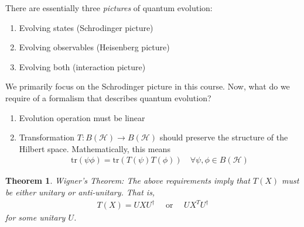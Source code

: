 \documentclass[10pt,oneside,longbibliography]{report}
\newtheorem{theorem}{Theorem}
\begin{document}
There are essentially three \textit{pictures} of quantum evolution:
\begin{enumerate}
    \item Evolving states (Schrodinger picture)
    \item Evolving observables (Heisenberg picture)
    \item Evolving both (interaction picture)
\end{enumerate}
We primarily focus on the Schrodinger picture in this course. Now, what do we require of a formalism that describes quantum evolution? 
\begin{enumerate}
    \item Evolution operation must be linear
    \item Transformation $T: B(\mathcal{H})\rightarrow B(\mathcal{H})$ should preserve the structure of the Hilbert space. Mathematically, this means
    \begin{align}
        \text{tr}(\psi \phi) = \text{tr}(T(\psi)T(\phi)) \quad \forall \psi,\phi \in B(\mathcal{H})
    \end{align}
\end{enumerate}

\begin{theorem}
Wigner's Theorem: The above requirements imply that $T(X)$ must be either unitary or anti-unitary. That is,
\begin{align}
    T(X) = UXU^{\dagger} \quad \text{ or } \quad U X^T U^{\dagger} 
\end{align}
for some unitary $U$. 
\end{theorem}
\end{document}
